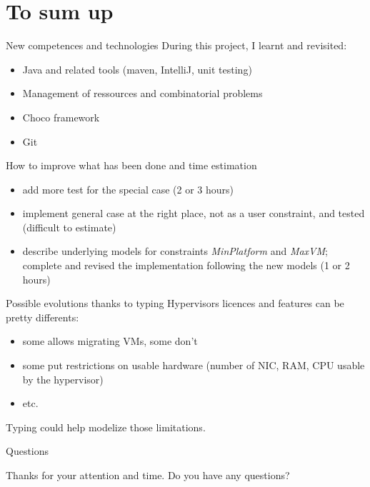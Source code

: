 \documentclass{beamer}
\begin{document}
\section{To sum up}
\begin{frame}{New competences and technologies}
During this project, I learnt and revisited:
\begin{itemize}
	\item Java and related tools (maven, IntelliJ, unit testing)
	\item Management of ressources and combinatorial problems
	\item Choco framework
	\item Git
\end{itemize}
\end{frame}
\begin{frame}{How to improve what has been done and time estimation}
\begin{itemize}
	\item add more test for the special case (2 or 3 hours)
	\item implement general case at the right place, not
		as a user constraint, and tested (difficult to estimate)
	\item describe underlying models for constraints \textit{MinPlatform}
		and \textit{MaxVM}; complete and revised the implementation
		following the new models (1 or 2 hours)
\end{itemize}
\end{frame}
\begin{frame}{Possible evolutions thanks to typing}
Hypervisors licences and features can be pretty differents:
\begin{itemize}
	\item some allows migrating VMs, some don't
	\item some put restrictions on usable hardware (number of NIC, RAM, CPU usable
		by the hypervisor)
	\item etc.
\end{itemize}
Typing could help modelize those limitations.
\end{frame}

\begin{frame}{Questions}
\begin{center}
Thanks for your attention and time. Do you have any questions?
\end{center}
\end{frame}

\end{document}
